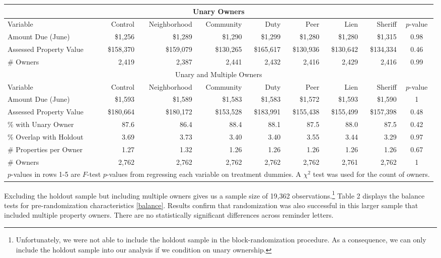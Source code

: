 \documentclass[12pt]{article}
\begin{document}
\begin{sidewaystable}[htbp]
\centering
\caption{Balance on Observables}\label{balance}
\bigskip
\begin{tabular}{lrrrrrrrc}
\hline
\multicolumn{9}{c}{Unary Owners} \\
\hline
Variable & Control & Neighborhood & Community & Duty & Peer & Lien & Sheriff & $p$-value \\ 
\hline
Amount Due (June) & \$1,256 & \$1,289 & \$1,290 & \$1,299 & \$1,280 & \$1,280 & \$1,315 & 0.98 \\ 
Assessed Property Value & \$158,370 & \$159,079 & \$130,265 & \$165,617 & \$130,936 & \$130,642 &
 \$134,334 & 0.46 \\ 
\# Owners & 2,419 & 2,387 & 2,441 & 2,432 & 2,416 & 2,429 & 2,416 & 0.99 \\ 
\hline
\multicolumn{9}{c}{Unary and Multiple Owners} \\
\hline
Variable & Control & Neighborhood & Community & Duty & Peer & Lien & Sheriff & $p$-value \\ 
\hline
Amount Due (June) & \$1,593 & \$1,589 & \$1,583 & \$1,583 & \$1,572 & \$1,593 & \$1,590 & 1 \\ 
Assessed Property Value & \$180,664 & \$180,172 & \$153,528 & \$183,991 & \$155,438 & \$155,499 & \$157,398 & 0.48 \\ 
\% with Unary Owner & 87.6 & 86.4 & 88.4 & 88.1 & 87.5 & 88.0 & 87.5 & 0.42 \\ 
\% Overlap with Holdout & 3.69 & 3.73 & 3.40 & 3.40 & 3.55 & 3.44 & 3.29 & 0.97 \\ 
\# Properties per Owner & 1.27 & 1.32 & 1.26 & 1.26 & 1.26 & 1.26 & 1.26 & 0.67 \\ 
\# Owners & 2,762 & 2,762 & 2,762 & 2,762 & 2,762 & 2,761 & 2,762 & 1 \\ 
\hline
\multicolumn{9}{l}{\scriptsize{$p$-values in rows 1-5 are $F$-test
    $p$-values from regressing each variable on treatment dummies. A
    $\chi^2$ test was used for the count of owners.}} \\
\end{tabular}
\end{sidewaystable}

Excluding the holdout sample but including multiple owners gives us a
sample size of 19,362 observations.\footnote{Unfortunately, we were
  not able to include the holdout sample in the block-randomization
  procedure. As a consequence, we can only include the holdout sample
  into our analysis if we condition on unary ownership.} Table 2
displays the balance tests for pre-randomization characteristics
\ref{balance}.  Results confirm that randomization was also successful
in this larger sample that included multiple property owners.  There
are no statistically significant differences across reminder letters.
\end{document}
